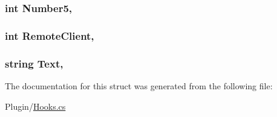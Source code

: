 \subsubsection[{Number5}]{\setlength{\rightskip}{0pt plus 5cm}int Number5\hspace{0.3cm}{\ttfamily [get]}, {\ttfamily [set]}}\label{structOTA_1_1Plugin_1_1HookArgs_1_1SendNetMessage_a916f45fca66dc84a59310d2bc8177651}
\hypertarget{structOTA_1_1Plugin_1_1HookArgs_1_1SendNetMessage_a40759627b2a827508158b451d3b720e1}{}
\subsubsection[{Remote\+Client}]{\setlength{\rightskip}{0pt plus 5cm}int Remote\+Client\hspace{0.3cm}{\ttfamily [get]}, {\ttfamily [set]}}\label{structOTA_1_1Plugin_1_1HookArgs_1_1SendNetMessage_a40759627b2a827508158b451d3b720e1}
\hypertarget{structOTA_1_1Plugin_1_1HookArgs_1_1SendNetMessage_ab4726c7c06ae41233e679361293b4173}{}
\subsubsection[{Text}]{\setlength{\rightskip}{0pt plus 5cm}string Text\hspace{0.3cm}{\ttfamily [get]}, {\ttfamily [set]}}\label{structOTA_1_1Plugin_1_1HookArgs_1_1SendNetMessage_ab4726c7c06ae41233e679361293b4173}


The documentation for this struct was generated from the following file\+:\begin{DoxyCompactItemize}
\item 
Plugin/\hyperlink{Hooks_8cs}{Hooks.\+cs}\end{DoxyCompactItemize}
